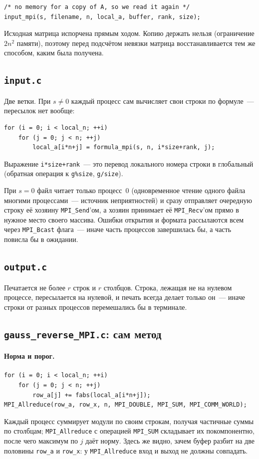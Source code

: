 \documentclass[11pt,a4paper]{report}
\begin{document}
\begin{lstlisting}[style=c]
/* no memory for a copy of A, so we read it again */
input_mpi(s, filename, n, local_a, buffer, rank, size);
\end{lstlisting}
Исходная матрица испорчена прямым ходом. Копию держать нельзя (ограничение
$2n^2$ памяти), поэтому перед подсчётом невязки матрица восстанавливается тем же
способом, каким была получена.

\subsection{\texttt{input.c}}

Две ветки. При $s\neq 0$ каждый процесс сам вычисляет свои строки по формуле~---
пересылок нет вообще:
\begin{lstlisting}[style=c]
for (i = 0; i < local_n; ++i)
    for (j = 0; j < n; ++j)
        local_a[i*n+j] = formula_mpi(s, n, i*size+rank, j);
\end{lstlisting}
Выражение \texttt{i*size+rank}~--- это перевод локального номера строки в
глобальный (обратная операция к \texttt{g\%size}, \texttt{g/size}).

При $s=0$ файл читает только процесс~0 (одновременное чтение одного файла
многими процессами~--- источник неприятностей) и сразу отправляет очередную
строку её хозяину \texttt{MPI\_Send}'ом, а хозяин принимает её
\texttt{MPI\_Recv}'ом прямо в нужное место своего массива. Ошибки открытия и
формата рассылаются всем через \texttt{MPI\_Bcast} флага~--- иначе часть
процессов завершилась бы, а часть повисла бы в ожидании.

\subsection{\texttt{output.c}}

Печатается не более $r$ строк и $r$ столбцов. Строка, лежащая не на нулевом
процессе, пересылается на нулевой, и печать всегда делает только он~--- иначе
строки от разных процессов перемешались бы в терминале.

\subsection{\texttt{gauss\_reverse\_MPI.c}: сам метод}

\paragraph{Норма и порог.}
\begin{lstlisting}[style=c]
for (i = 0; i < local_n; ++i)
    for (j = 0; j < n; ++j)
        row_a[j] += fabs(local_a[i*n+j]);
MPI_Allreduce(row_a, row_x, n, MPI_DOUBLE, MPI_SUM, MPI_COMM_WORLD);
\end{lstlisting}
Каждый процесс суммирует модули по своим строкам, получая частичные суммы по
столбцам; \texttt{MPI\_Allreduce} с операцией \texttt{MPI\_SUM} складывает их
покомпонентно, после чего максимум по $j$ даёт норму. Здесь же видно, зачем
буфер разбит на две половины \texttt{row\_a} и \texttt{row\_x}: у
\texttt{MPI\_Allreduce} вход и выход не должны совпадать.
\end{document}

